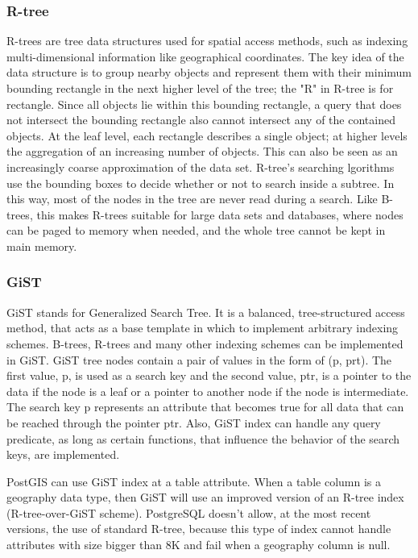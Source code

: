 \subsubsection{R-tree}

R-trees \cite{14} are tree data structures used for spatial access methods, such as indexing multi-dimensional information like geographical coordinates. 
The key idea of the data structure is to group nearby objects and represent them with their minimum bounding rectangle in the next higher level of the tree; 
the "R" in R-tree is for rectangle. Since all objects lie within this bounding rectangle, a query that does not intersect the bounding rectangle also cannot 
intersect any of the contained objects. At the leaf level, each rectangle describes a single object; at higher levels the aggregation of an increasing number 
of objects. This can also be seen as an increasingly coarse approximation of the data set. 
R-tree's searching lgorithms use the bounding boxes to decide whether or not to search inside a subtree. In this way, most of the nodes in the tree are never 
read during a search. Like B-trees, this makes R-trees suitable for large data sets and databases, where nodes can be paged to memory when needed, and the whole 
tree cannot be kept in main memory. 

\subsubsection{GiST}

GiST \cite{15} stands for Generalized Search Tree. It is a balanced, tree-structured access method, that acts as a base template in which to implement arbitrary 
indexing schemes. B-trees, R-trees and many other indexing schemes can be implemented in GiST. GiST tree nodes contain a pair of values in the form of (p, prt). 
The first value, p, is used as a search key and the second value, ptr, is a pointer to the data if the node is a leaf or a pointer to another node 
if the node is intermediate. The search key p represents an attribute that becomes true for all data that can be reached through the pointer ptr. 
Also, GiST index can handle any query predicate, as long as certain functions, that influence the behavior of the search keys, are implemented. 

PostGIS can use GiST index at a table attribute. When a table column is a geography data type, then GiST will use an improved version of an R-tree index 
(R-tree-over-GiST scheme). PostgreSQL doesn't allow, at the most recent versions, the use of standard R-tree, because this type of index 
cannot handle attributes with size bigger than 8K and fail when a geography column is null. 

